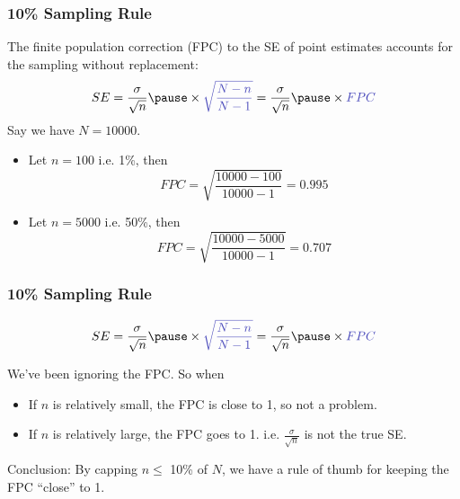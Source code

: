 \documentclass[handout]{beamer}
\newcommand{\blue}[1]{\textcolor{blue2}{#1}}
\begin{document}
\begin{frame}[fragile]
\frametitle{10\% Sampling Rule}
The \blue{finite population correction (FPC)} to the SE of point estimates accounts for the sampling without replacement:
\[
SE = \frac{\sigma}{\sqrt{n}} \pause \times \blue{\sqrt{\frac{N-n}{N-1}}} =
\frac{\sigma}{\sqrt{n}} \pause \times \blue{FPC}
\]
Say we have $N=10000$.  
\begin{itemize}
\pause\item Let $n=100$ i.e. 1\%, then
\[
FPC=\sqrt{\frac{10000-100}{10000-1}} = 0.995
\]
\pause\item Let $n=5000$ i.e. 50\%, then
\[
FPC=\sqrt{\frac{10000-5000}{10000-1}} = 0.707
\]
\end{itemize}

\end{frame}


\begin{frame}[fragile]
\frametitle{10\% Sampling Rule}
\[
SE = \frac{\sigma}{\sqrt{n}} \pause \times \blue{\sqrt{\frac{N-n}{N-1}}} =
\frac{\sigma}{\sqrt{n}} \pause \times \blue{FPC}
\]

\vspace{0.25cm}
\pause
We've been ignoring the \blue{FPC}.  So when 
\begin{itemize}
\pause\item If $n$ is relatively small, the FPC is close to 1, so not a problem.
\pause\item If $n$ is relatively large, the FPC goes to 1.  i.e. $\frac{\sigma}{\sqrt{n}}$ is not the true SE.  
\end{itemize}

\vspace{0.25cm}
\pause Conclusion:  By capping $n \leq $ 10\% of $N$, we have a \blue{rule of thumb} for keeping the FPC ``close'' to 1.  

\end{frame}
\end{document}
